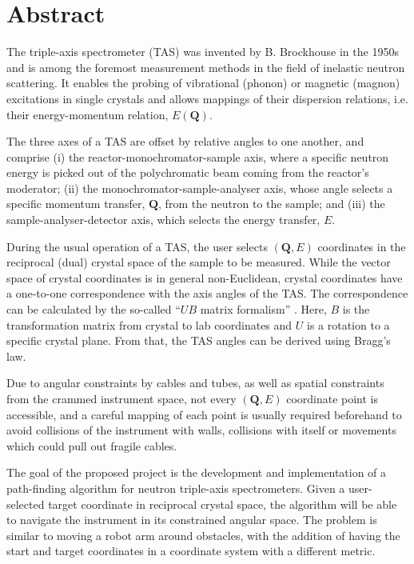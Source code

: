 %
%

\chapter*{Abstract}

The triple-axis spectrometer (TAS) \cite{Shirane2002} was invented by B. Brockhouse in the 1950s and 
is among the foremost measurement methods in the field of inelastic neutron scattering. 
It enables the probing of vibrational (phonon) or magnetic (magnon) excitations in single crystals and allows 
mappings of their dispersion relations, i.e. their energy-momentum relation, $E\left( \bm{Q} \right)$.

The three axes of a TAS are offset by relative angles to one another, and comprise 
(i) the reactor-monochromator-sample axis, where a specific neutron energy is picked out of the polychromatic 
beam coming from the reactor's moderator; 
(ii) the monochromator-sample-analyser axis, whose angle selects a specific momentum transfer, $\bm{Q}$, 
from the neutron to the sample; and 
(iii) the sample-analyser-detector axis, which selects the energy transfer, $E$.

During the usual operation of a TAS, the user selects $\left( \bm{Q}, E \right)$ coordinates in the reciprocal (dual)
crystal space of the sample to be measured. While the vector space of crystal coordinates 
is in general non-Euclidean, crystal coordinates have a one-to-one correspondence with the axis angles 
of the TAS. The correspondence can be calculated by the so-called ``$UB$ matrix formalism'' \cite{Lumsden2005}. 
Here, $B$ is the transformation matrix from crystal to lab coordinates and $U$ is a rotation to a specific 
crystal plane. From that, the TAS angles can be derived using Bragg's law.

Due to angular constraints by cables and tubes, as well as spatial constraints from the crammed instrument space, 
not every $\left( \bm{Q}, E \right)$ coordinate point is accessible, and a careful mapping of each point is
usually required beforehand to avoid collisions of the instrument with walls, collisions with itself or movements
which could pull out fragile cables.

The goal of the proposed project is the development and implementation of a path-finding algorithm for 
neutron triple-axis spectrometers. Given a user-selected target coordinate in reciprocal crystal space, 
the algorithm will be able to navigate the instrument in its constrained angular space. The problem is similar to 
moving a robot arm around obstacles, with the addition of having the start and target coordinates in a 
coordinate system with a different metric.

